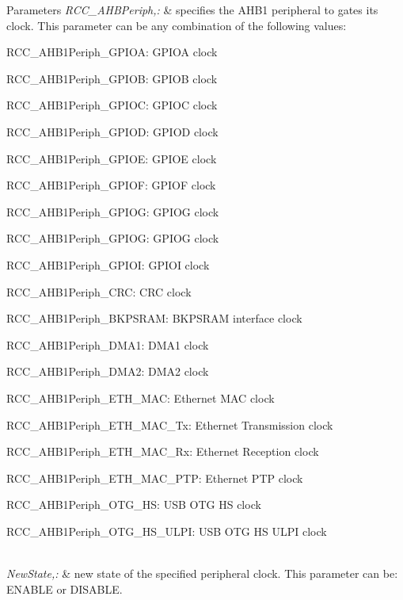 \begin{DoxyParams}{Parameters}
{\em R\-C\-C\-\_\-\-A\-H\-B\-Periph,\-:} & specifies the A\-H\-B1 peripheral to gates its clock. This parameter can be any combination of the following values\-: \begin{DoxyItemize}
\item R\-C\-C\-\_\-\-A\-H\-B1\-Periph\-\_\-\-G\-P\-I\-O\-A\-: G\-P\-I\-O\-A clock \item R\-C\-C\-\_\-\-A\-H\-B1\-Periph\-\_\-\-G\-P\-I\-O\-B\-: G\-P\-I\-O\-B clock \item R\-C\-C\-\_\-\-A\-H\-B1\-Periph\-\_\-\-G\-P\-I\-O\-C\-: G\-P\-I\-O\-C clock \item R\-C\-C\-\_\-\-A\-H\-B1\-Periph\-\_\-\-G\-P\-I\-O\-D\-: G\-P\-I\-O\-D clock \item R\-C\-C\-\_\-\-A\-H\-B1\-Periph\-\_\-\-G\-P\-I\-O\-E\-: G\-P\-I\-O\-E clock \item R\-C\-C\-\_\-\-A\-H\-B1\-Periph\-\_\-\-G\-P\-I\-O\-F\-: G\-P\-I\-O\-F clock \item R\-C\-C\-\_\-\-A\-H\-B1\-Periph\-\_\-\-G\-P\-I\-O\-G\-: G\-P\-I\-O\-G clock \item R\-C\-C\-\_\-\-A\-H\-B1\-Periph\-\_\-\-G\-P\-I\-O\-G\-: G\-P\-I\-O\-G clock \item R\-C\-C\-\_\-\-A\-H\-B1\-Periph\-\_\-\-G\-P\-I\-O\-I\-: G\-P\-I\-O\-I clock \item R\-C\-C\-\_\-\-A\-H\-B1\-Periph\-\_\-\-C\-R\-C\-: C\-R\-C clock \item R\-C\-C\-\_\-\-A\-H\-B1\-Periph\-\_\-\-B\-K\-P\-S\-R\-A\-M\-: B\-K\-P\-S\-R\-A\-M interface clock \item R\-C\-C\-\_\-\-A\-H\-B1\-Periph\-\_\-\-D\-M\-A1\-: D\-M\-A1 clock \item R\-C\-C\-\_\-\-A\-H\-B1\-Periph\-\_\-\-D\-M\-A2\-: D\-M\-A2 clock \item R\-C\-C\-\_\-\-A\-H\-B1\-Periph\-\_\-\-E\-T\-H\-\_\-\-M\-A\-C\-: Ethernet M\-A\-C clock \item R\-C\-C\-\_\-\-A\-H\-B1\-Periph\-\_\-\-E\-T\-H\-\_\-\-M\-A\-C\-\_\-\-Tx\-: Ethernet Transmission clock \item R\-C\-C\-\_\-\-A\-H\-B1\-Periph\-\_\-\-E\-T\-H\-\_\-\-M\-A\-C\-\_\-\-Rx\-: Ethernet Reception clock \item R\-C\-C\-\_\-\-A\-H\-B1\-Periph\-\_\-\-E\-T\-H\-\_\-\-M\-A\-C\-\_\-\-P\-T\-P\-: Ethernet P\-T\-P clock \item R\-C\-C\-\_\-\-A\-H\-B1\-Periph\-\_\-\-O\-T\-G\-\_\-\-H\-S\-: U\-S\-B O\-T\-G H\-S clock \item R\-C\-C\-\_\-\-A\-H\-B1\-Periph\-\_\-\-O\-T\-G\-\_\-\-H\-S\-\_\-\-U\-L\-P\-I\-: U\-S\-B O\-T\-G H\-S U\-L\-P\-I clock \end{DoxyItemize}
\\
\hline
{\em New\-State,\-:} & new state of the specified peripheral clock. This parameter can be\-: E\-N\-A\-B\-L\-E or D\-I\-S\-A\-B\-L\-E. \\
\hline
\end{DoxyParams}

